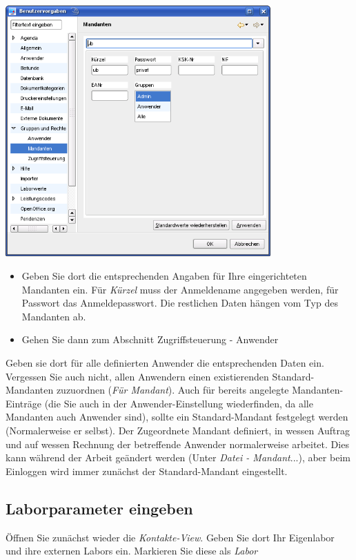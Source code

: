 \includegraphics[width=4in]{images/grundkonfmand.png}
\begin{itemize}
 \item Geben Sie dort die entsprechenden Angaben für Ihre eingerichteten Mandanten ein. Für \textit{Kürzel} muss der Anmeldename angegeben werden, für Passwort das Anmeldepasswort. Die restlichen Daten hängen vom Typ des Mandanten ab.
 \item Gehen Sie dann zum Abschnitt Zugriffsteuerung - Anwender
\end{itemize}

Geben sie dort für alle definierten Anwender die entsprechenden Daten ein. Vergessen Sie auch nicht, allen Anwendern einen existierenden Standard-Mandanten zuzuordnen (\textit{Für Mandant}). Auch für bereits angelegte Mandanten-Einträge (die Sie auch in der Anwender-Einstellung wiederfinden, da alle Mandanten auch Anwender sind), sollte ein Standard-Mandant festgelegt werden (Normalerweise er selbst). Der Zugeordnete Mandant definiert, in wessen Auftrag und auf wessen Rechnung der betreffende Anwender normalerweise arbeitet. Dies kann während der Arbeit geändert werden (Unter \textit{Datei - Mandant}...), aber beim Einloggen wird immer zunächst der Standard-Mandant eingestellt.

\subsection{Laborparameter eingeben}
Öffnen Sie zunächst wieder die \textit{Kontakte-View}. Geben Sie dort Ihr Eigenlabor und ihre externen Labors ein. Markieren Sie diese als \textit{Labor}


